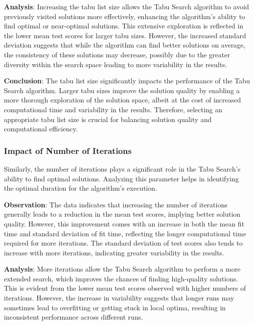 \documentclass{article}
\begin{document}
    \textbf{Analysis}: Increasing the tabu list size allows the Tabu Search algorithm to avoid previously visited solutions more effectively, enhancing the algorithm's ability to find optimal or near-optimal solutions. This extensive exploration is reflected in the lower mean test scores for larger tabu sizes. However, the increased standard deviation suggests that while the algorithm can find better solutions on average, the consistency of these solutions may decrease, possibly due to the greater diversity within the search space leading to more variability in the results.

    \textbf{Conclusion}: The tabu list size significantly impacts the performance of the Tabu Search algorithm. Larger tabu sizes improve the solution quality by enabling a more thorough exploration of the solution space, albeit at the cost of increased computational time and variability in the results. Therefore, selecting an appropriate tabu list size is crucial for balancing solution quality and computational efficiency.

    \subsubsection{Impact of Number of Iterations}

    Similarly, the number of iterations plays a significant role in the Tabu Search's ability to find optimal solutions. Analyzing this parameter helps in identifying the optimal duration for the algorithm’s execution.

    \textbf{Observation}: The data indicates that increasing the number of iterations generally leads to a reduction in the mean test scores, implying better solution quality. However, this improvement comes with an increase in both the mean fit time and standard deviation of fit time, reflecting the longer computational time required for more iterations. The standard deviation of test scores also tends to increase with more iterations, indicating greater variability in the results.

    \textbf{Analysis}: More iterations allow the Tabu Search algorithm to perform a more extended search, which improves the chances of finding high-quality solutions. This is evident from the lower mean test scores observed with higher numbers of iterations. However, the increase in variability suggests that longer runs may sometimes lead to overfitting or getting stuck in local optima, resulting in inconsistent performance across different runs.
\end{document}
